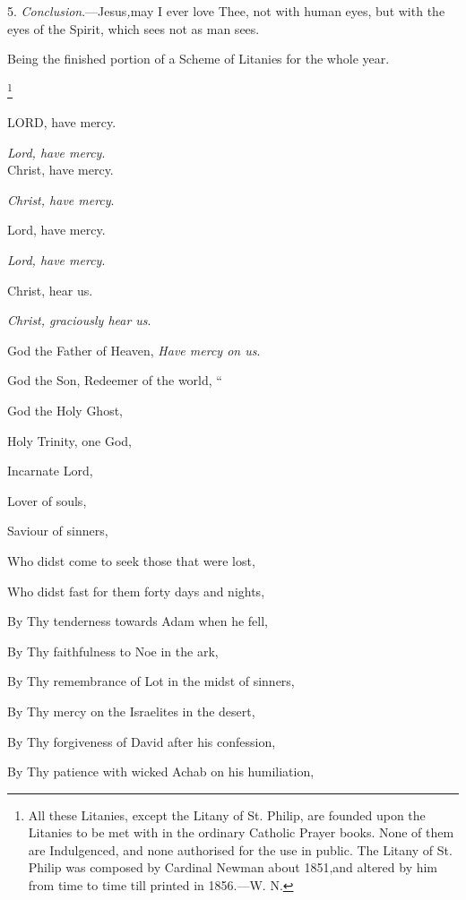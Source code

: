 5. \emph{Conclusion}.—Jesus\emph{,}may I ever love Thee, not with human eyes, but with the eyes of the
Spirit, which sees not as man sees.


Being the finished portion of a
Scheme of Litanies for the whole year.

\footnote{

All these Litanies, except the
Litany of St. Philip, are founded upon the Litanies to be met with in
the ordinary Catholic Prayer books. None of them are Indulgenced, and
none authorised for the use in public. The Litany of St. Philip was
composed by Cardinal Newman about 1851,\emph{}and altered by him from
time to time till printed in 1856.—W. N.}



LORD, have mercy.

\emph{Lord, have mercy}.\emph{}\\
Christ, have mercy.

\emph{Christ, have mercy}.

Lord, have mercy.

\emph{Lord, have mercy}.

Christ, hear us.

\emph{Christ, graciously hear us}.

God the Father of Heaven,
\emph{Have mercy on us}.

God the Son, Redeemer of the
world,
``

God the Holy Ghost,

Holy Trinity, one God,

Incarnate Lord,

Lover of souls,

Saviour of sinners, 

Who didst come to seek those that were lost,

Who didst fast for them forty days and nights,

By Thy tenderness towards Adam when he fell,

By Thy faithfulness to Noe in the ark,

By Thy remembrance of Lot in the midst of sinners,

By Thy mercy on the Israelites in the desert,

By Thy forgiveness of David after his confession,

By Thy patience with wicked Achab on his humiliation,

